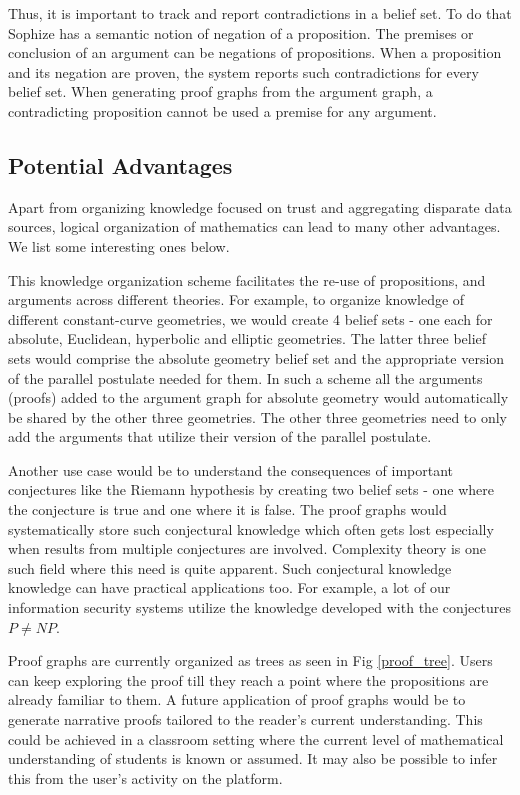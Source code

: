 \documentclass[runningheads]{llncs}
\begin{document}
Thus, it is important to track and report contradictions in a belief set. To do that Sophize has a semantic notion of negation of a proposition. The premises or conclusion of an argument can be negations of propositions. When a proposition and its negation are proven, the system reports such contradictions for every belief set. When generating proof graphs from the argument graph, a contradicting proposition cannot be used a premise for any argument.

\subsection{Potential Advantages}

Apart from organizing knowledge focused on trust and aggregating disparate data sources, logical organization of mathematics can lead to many other advantages. We list some interesting ones below.

This knowledge organization scheme facilitates the re-use of propositions, and arguments across different theories. For example, to organize knowledge of different constant-curve geometries, we would create 4 belief sets - one each for absolute, Euclidean, hyperbolic and elliptic geometries. The latter three belief sets would comprise the absolute geometry belief set and the appropriate version of the parallel postulate needed for them. In such a scheme all the arguments (proofs) added to the argument graph for absolute geometry would automatically be shared by the other three geometries. The other three geometries need to only add the arguments that utilize their version of the parallel postulate.

Another use case would be to understand the consequences of important conjectures like the Riemann hypothesis by creating two belief sets - one where the conjecture is true and one where it is false. The proof graphs would systematically store such conjectural knowledge which often gets lost especially when results from multiple conjectures are involved. Complexity theory is one such field where this need is quite apparent. Such conjectural knowledge knowledge can have practical applications too. For example, a lot of our information security systems utilize the knowledge developed with the conjectures $P \neq NP$.

Proof graphs are currently organized as trees as seen in Fig \ref{proof_tree}. Users can keep exploring the proof till they reach a point where the propositions are already familiar to them. A future application of proof graphs would be to generate narrative proofs tailored to the reader's current understanding. This could be achieved in a classroom setting where the current level of mathematical understanding of students is known or assumed. It may also be possible to infer this from the user's activity on the platform.
\end{document}
